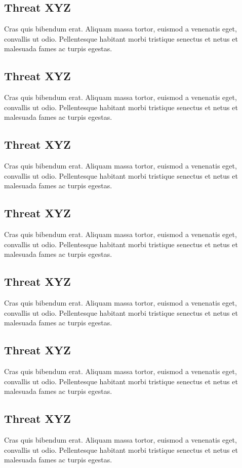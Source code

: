 \documentclass[runningheads]{llncs}
\begin{document}
\subsection{Threat XYZ}
Cras quis bibendum erat. Aliquam massa tortor, euismod a venenatis eget, convallis ut odio. Pellentesque habitant morbi tristique senectus et netus et malesuada fames ac turpis egestas.
%
\subsection{Threat XYZ}
Cras quis bibendum erat. Aliquam massa tortor, euismod a venenatis eget, convallis ut odio. Pellentesque habitant morbi tristique senectus et netus et malesuada fames ac turpis egestas.
%
\subsection{Threat XYZ}
Cras quis bibendum erat. Aliquam massa tortor, euismod a venenatis eget, convallis ut odio. Pellentesque habitant morbi tristique senectus et netus et malesuada fames ac turpis egestas.
%
\subsection{Threat XYZ}
Cras quis bibendum erat. Aliquam massa tortor, euismod a venenatis eget, convallis ut odio. Pellentesque habitant morbi tristique senectus et netus et malesuada fames ac turpis egestas.
%
\subsection{Threat XYZ}
Cras quis bibendum erat. Aliquam massa tortor, euismod a venenatis eget, convallis ut odio. Pellentesque habitant morbi tristique senectus et netus et malesuada fames ac turpis egestas.
%
\subsection{Threat XYZ}
Cras quis bibendum erat. Aliquam massa tortor, euismod a venenatis eget, convallis ut odio. Pellentesque habitant morbi tristique senectus et netus et malesuada fames ac turpis egestas.
%
\subsection{Threat XYZ}
Cras quis bibendum erat. Aliquam massa tortor, euismod a venenatis eget, convallis ut odio. Pellentesque habitant morbi tristique senectus et netus et malesuada fames ac turpis egestas.
%
\end{document}
